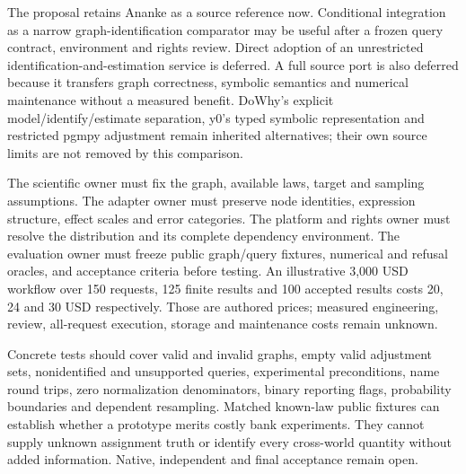 The proposal retains Ananke as a source reference now. Conditional integration
as a narrow graph-identification comparator may be useful after a frozen
query contract, environment and rights review. Direct adoption of an
unrestricted identification-and-estimation service is deferred. A full
source port is also deferred because it transfers graph correctness,
symbolic semantics and numerical maintenance without a measured benefit.
DoWhy's explicit model/identify/estimate separation, y0's typed symbolic
representation and restricted pgmpy adjustment remain inherited alternatives;
their own source limits are not removed by this comparison.
\citep{exec24_ananke_choice}

The scientific owner must fix the graph, available laws, target and
sampling assumptions. The adapter owner must preserve node identities,
expression structure, effect scales and error categories. The platform
and rights owner must resolve the distribution and its complete dependency
environment. The evaluation owner must freeze public graph/query fixtures,
numerical and refusal oracles, and acceptance criteria before testing.
An illustrative 3,000 USD workflow over 150 requests, 125 finite results
and 100 accepted results costs 20, 24 and 30 USD respectively. Those are
authored prices; measured engineering, review, all-request execution,
storage and maintenance costs remain unknown.
\citep{exec24_ananke_choice}

Concrete tests should cover valid and invalid graphs, empty valid adjustment
sets, nonidentified and unsupported queries, experimental preconditions,
name round trips, zero normalization denominators, binary reporting flags,
probability boundaries and dependent resampling. Matched known-law public
fixtures can establish whether a prototype merits costly bank experiments.
They cannot supply unknown assignment truth or identify every cross-world
quantity without added information. Native, independent and final
acceptance remain open.~\citep{exec24_ananke_choice}
